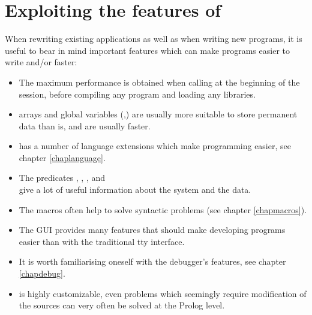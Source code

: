 \section{Exploiting the features of {\eclipse}}
When rewriting existing applications as well as when writing new programs,
it is useful to bear in mind important {\eclipse} features which can make
programs easier to write and/or faster:
\begin{itemize}
\item The maximum performance is obtained when calling
at the beginning of the session, before compiling any program and loading
any libraries.

\item {\eclipse} arrays and global variables
(,)
are usually
more suitable to store permanent data than
 is, and are usually
faster.

\item {\eclipse} has a number of language extensions which make programming
easier, see chapter \ref{chaplanguage}.

\item The predicates , ,
,  and\\
give a lot of useful information about the system and the data.

\item The {\eclipse} macros often help to solve syntactic problems
(see chapter \ref{chapmacros}).

\item The {\tkeclipse} GUI provides many features that should make
developing programs easier than with the traditional tty interface.

\item It is worth familiarising oneself with the debugger's features,
see chapter \ref{chapdebug}.

\item {\eclipse} is highly customizable, even problems which seemingly
require modification of the {\eclipse} sources
can very often be solved at the Prolog level.
\end{itemize}

